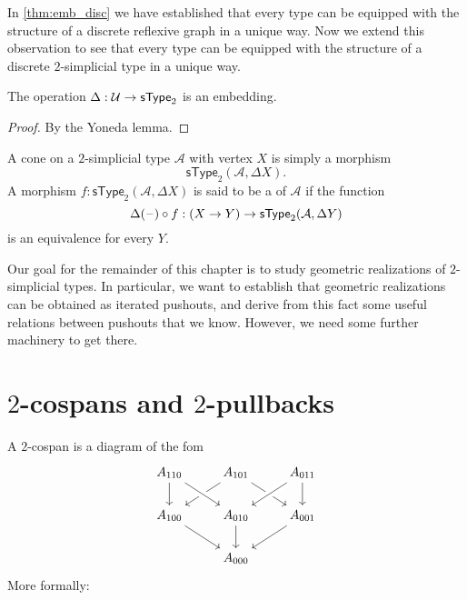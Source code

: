 In \cref{thm:emb_disc} we have established that every type can be equipped with the structure of a discrete reflexive graph in a unique way. Now we extend this observation to see that every type can be equipped with the structure of a discrete $2$-simplicial type in a unique way.

\begin{prp}\label{prp:2disc_emb}
The operation $\Delta:\mathcal{U}\to \mathsf{sType}_2$ is an embedding.
\end{prp}

\begin{proof}
By the Yoneda lemma.
\end{proof}

\begin{defn}
A cone on a $2$-simplicial type $\mathcal{A}$ with vertex $X$ is simply a morphism
\begin{equation*}
\mathsf{sType}_2(\mathcal{A},\Delta X).
\end{equation*}
A morphism $f:\mathsf{sType}_2(\mathcal{A},\Delta X)$ is said to be a  of $\mathcal{A}$ if the function
\begin{equation*}
\Delta(\mathord{\hspace{1pt}\text{--}\hspace{1pt}})\circ f : (X\to Y) \to \mathsf{sType}_2(\mathcal{A},\Delta Y)
\end{equation*}
is an equivalence for every $Y$. 
\end{defn}

Our goal for the remainder of this chapter is to study geometric realizations of $2$-simplicial types. In particular, we want to establish that geometric realizations can be obtained as iterated pushouts, and derive from this fact some useful relations between pushouts that we know. However, we need some further machinery to get there.

\section{\texorpdfstring{$2$}{2}-cospans and \texorpdfstring{$2$}{2}-pullbacks}

A $2$-cospan is a diagram of the fom
\begin{equation*}
\begin{tikzcd}
A_{110} \arrow[d] & A_{101} \arrow[dl] \arrow[dr] & A_{011} \arrow[d] \\
A_{100} \arrow[dr] & A_{010} \arrow[d] \arrow[from=ul,crossing over] \arrow[from=ur,crossing over] & A_{001} \arrow[dl] \\
& A_{000}
\end{tikzcd}
\end{equation*}
More formally:

